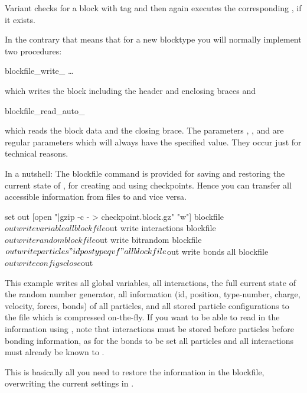 Variant  checks for a block with tag  and then
again executes the corresponding ,
if it exists.

In the contrary that means that for a new blocktype you will normally
implement two procedures:
\begin{essyntaxbox}
  blockfile_write_    \dots
\end{essyntaxbox}
which writes the block including the header and enclosing braces and
\begin{essyntaxbox}
  blockfile_read_auto_   
\end{essyntaxbox}
which reads the block data and the closing brace. The parameters
, ,  and  are regular
parameters which will always have the specified value. They occur just
for technical reasons.

In a nutshell: The blockfile command is provided for saving and
restoring the current state of \es, \eg for creating and using
checkpoints. Hence you can transfer all accessible information from
files to \es and vice versa.

\begin{tclcode}
set out [open "|gzip -c - > checkpoint.block.gz" "w"]
blockfile $out write variable all
blockfile $out write interactions
blockfile $out write random
blockfile $out write bitrandom
blockfile $out write particles "id pos type q v f" all
blockfile $out write bonds all
blockfile $out write configs
close $out 
\end{tclcode}

This example writes all global variables, all interactions, the full
current state of the random number generator, all information (\ie id,
position, type-number, charge, velocity, forces, bonds) of all
particles, and all stored particle configurations to the file
 which is compressed on-the-fly.  If you want
to be able to read in the information using \es, note that
interactions must be stored before particles before bonding
information, as for the bonds to be set all particles and all
interactions must already be known to \es.

This is basically all you need to restore the information in the
blockfile, overwriting the current settings in \es.


